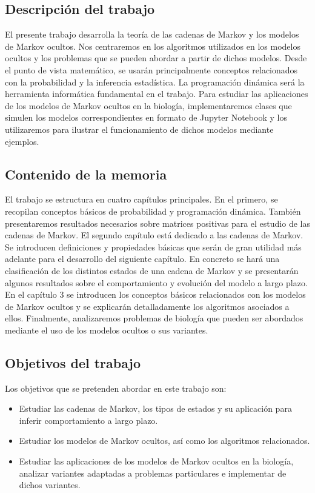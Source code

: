 \subsection*{Descripción del trabajo}
El presente trabajo desarrolla la teoría de las cadenas de Markov y los modelos de Markov ocultos. Nos centraremos en los algoritmos utilizados en los modelos ocultos y los problemas que se pueden abordar a partir de dichos modelos. Desde el punto de vista matemático, se usarán principalmente conceptos relacionados con la probabilidad y la inferencia estadística. La programación dinámica será la herramienta informática fundamental en el trabajo. Para estudiar las aplicaciones de los modelos de Markov ocultos en la biología, implementaremos clases que simulen los modelos correspondientes en formato de Jupyter Notebook y los utilizaremos para ilustrar el funcionamiento de dichos modelos mediante ejemplos.    

\subsection*{Contenido de la memoria}
El trabajo se estructura en cuatro capítulos principales. En el primero, se recopilan conceptos básicos de probabilidad y programación dinámica. También presentaremos resultados necesarios sobre matrices positivas para el estudio de las cadenas de Markov. El segundo capítulo está dedicado a las cadenas de Markov. Se introducen definiciones y propiedades básicas que serán de gran utilidad más adelante para el desarrollo del siguiente capítulo. En concreto se hará una clasificación de los distintos estados de una cadena de Markov y se presentarán algunos resultados sobre el comportamiento y evolución del modelo a largo plazo. En el capítulo $3$ se introducen los conceptos básicos relacionados con los modelos de Markov ocultos y se explicarán detalladamente los algoritmos asociados a ellos. Finalmente, analizaremos problemas de biología que pueden ser abordados mediante el uso de los modelos ocultos o sus variantes.


\subsection*{Objetivos del trabajo}
Los objetivos que se pretenden abordar en este trabajo son:
\begin{itemize}
    \item Estudiar las cadenas de Markov, los tipos de estados y su aplicación para inferir comportamiento a largo plazo.
    \item Estudiar los modelos de Markov ocultos, así como los algoritmos relacionados.
    \item Estudiar las aplicaciones de los modelos de Markov ocultos en la biología, analizar variantes adaptadas a problemas particulares e implementar de dichos variantes.
\end{itemize}